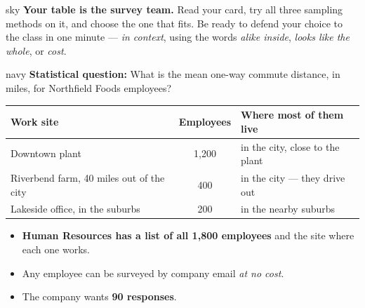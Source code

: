 \documentclass[12pt]{article}
\begin{document}
\clearpage
{}

\boxguard[10]
\begin{headlinebox}{sky}
\small
\textbf{Your table is the survey team.} Read your card, try all three sampling methods on it,
and choose the one that fits. Be ready to defend your choice to the class in one minute ---
\emph{in context}, using the words \emph{alike inside}, \emph{looks like the whole}, or
\emph{cost}.
\end{headlinebox}

\vspace{0.08in}

\boxguard[12]
\begin{scenariobox}{navy}
\small
\textbf{Statistical question:} What is the mean one-way commute distance, in miles, for
Northfield Foods employees?
\par\vspace{4pt}
{\centering\footnotesize
\renewcommand{\arraystretch}{1.2}
\begin{tabular}{@{}l c l@{}}
\rowcolor{sky}
\textbf{Work site} & \textbf{Employees} & \textbf{Where most of them live} \\
\hline
Downtown plant & 1{,}200 & in the city, close to the plant \\
Riverbend farm, 40 miles out of the city & 400 & in the city --- they drive out \\
Lakeside office, in the suburbs & 200 & in the nearby suburbs \\
\end{tabular}\par}
\begin{itemize}[leftmargin=1.3em, itemsep=2pt, topsep=4pt]
  \item \textbf{Human Resources has a list of all 1{,}800 employees} and the site where each
        one works.
  \item Any employee can be surveyed by company email \emph{at no cost}.
  \item The company wants \textbf{90 responses}.
\end{itemize}
\end{scenariobox}

\vspace{0.08in}
\end{document}

